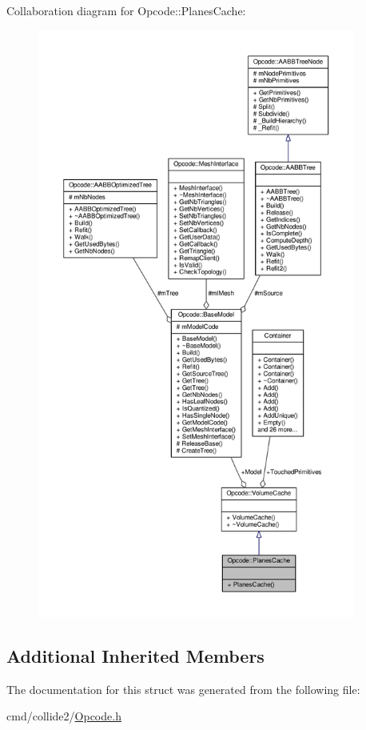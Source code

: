 Collaboration diagram for Opcode\+:\+:Planes\+Cache\+:
\nopagebreak
\begin{figure}[H]
\begin{center}
\leavevmode
\includegraphics[height=550pt]{d0/db6/structOpcode_1_1PlanesCache__coll__graph}
\end{center}
\end{figure}
\subsection*{Additional Inherited Members}


The documentation for this struct was generated from the following file\+:\begin{DoxyCompactItemize}
\item 
cmd/collide2/\hyperlink{Opcode_8h}{Opcode.\+h}\end{DoxyCompactItemize}
